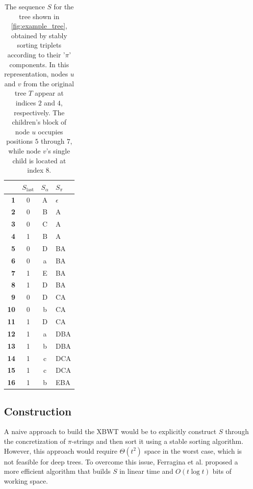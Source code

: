 \begin{table}[H]
    \centering
    \begin{tabular}{r c c l}
    \hline\hline
    \textbf{} & \textbf{$S_{\text{last}}$} & \textbf{$S_{\alpha}$} & \textbf{$S_{\pi}$} \\
    \hline
    \textbf{1} & 0 & A & $\epsilon$ \\
    \textbf{2} & 0 & B & A \\
    \textbf{3} & 0 & C & A \\
    \textbf{4} & 1 & B & A \\
    \textbf{5} & 0 & D & BA \\
    \textbf{6} & 0 & a & BA \\
    \textbf{7} & 1 & E & BA \\
    \textbf{8} & 1 & D & BA \\
    \textbf{9} & 0 & D & CA \\
    \textbf{10} & 0 & b & CA \\
    \textbf{11} & 1 & D & CA \\
    \textbf{12} & 1 & a & DBA \\
    \textbf{13} & 1 & b & DBA \\
    \textbf{14} & 1 & c & DCA \\
    \textbf{15} & 1 & c & DCA \\
    \textbf{16} & 1 & b & EBA \\
    \hline\hline
    \end{tabular}
    \caption{The sequence $S$ for the tree shown in \cref{fig:example_tree}, obtained by stably sorting triplets according to their '$\pi$' components. In this representation, nodes $u$ and $v$ from the original tree $T$ appear at indices $2$ and $4$, respectively. The children's block of node $u$ occupies positions $5$ through $7$, while node $v$'s single child is located at index $8$.}
    \label{tab:xbwt_example}
\end{table}

\subsection{Construction}
A naive approach to build the XBWT would be to explicitly construct $S$ through the concretization of $\pi$-strings and then sort it using a stable sorting algorithm. However, this approach would require $\Theta(t^2)$ space in the worst case, which is not feasible for deep trees. To overcome this issue, Ferragina et al. \cite{ferragina2009compressing} proposed a more efficient algorithm that builds $S$ in linear time and $O(t \log t)$ bits of working space.

